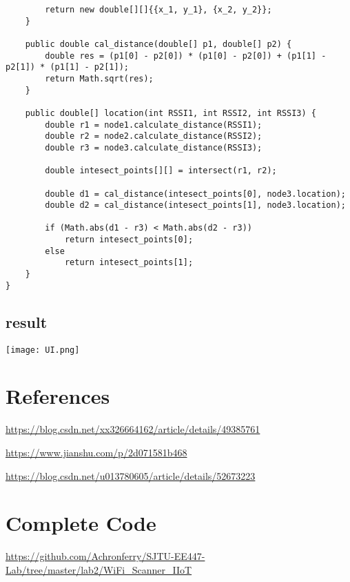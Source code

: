 \documentclass[12pt]{report}
\begin{document}
\begin{lstlisting}
		return new double[][]{{x_1, y_1}, {x_2, y_2}};
	}
	
	public double cal_distance(double[] p1, double[] p2) {
		double res = (p1[0] - p2[0]) * (p1[0] - p2[0]) + (p1[1] - p2[1]) * (p1[1] - p2[1]);
		return Math.sqrt(res);
	}
	
	public double[] location(int RSSI1, int RSSI2, int RSSI3) {
		double r1 = node1.calculate_distance(RSSI1);
		double r2 = node2.calculate_distance(RSSI2);
		double r3 = node3.calculate_distance(RSSI3);
		
		double intesect_points[][] = intersect(r1, r2);
		
		double d1 = cal_distance(intesect_points[0], node3.location);
		double d2 = cal_distance(intesect_points[1], node3.location);
		
		if (Math.abs(d1 - r3) < Math.abs(d2 - r3))
			return intesect_points[0];
		else
			return intesect_points[1];
	}
}
\end{lstlisting}
\subsection{result}
\texttt{[image: UI.png]}
\section{References}
\begin{itemize}
\begin{spacing}{0.1}
\item \url{https://blog.csdn.net/xx326664162/article/details/49385761}
\item \url{https://www.jianshu.com/p/2d071581b468}
\item \url{https://blog.csdn.net/u013780605/article/details/52673223}
\end{spacing}
\end{itemize}



\section{Complete Code}
\noindent\url{https://github.com/Achronferry/SJTU-EE447-Lab/tree/master/lab2/WiFi_Scanner_IIoT}
\end{document}
